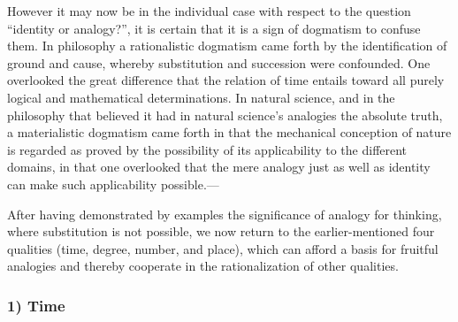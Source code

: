 \documentclass[12pt,a4paper]{book}
\newcommand{\opage}[1]{\marginnote{\footnotesize\textit{[#1]}}}
\begin{document}
\opage{186}However it may now be in the individual case with respect to the question
``identity or analogy?'', it is certain that it is a sign of dogmatism to
confuse them. In philosophy a rationalistic dogmatism came forth by the
identification of ground and cause, whereby substitution and succession were
confounded. One overlooked the great difference that the relation of time
entails toward all purely logical and mathematical determinations. In natural
science, and in the philosophy that believed it had in natural science's
analogies the absolute truth, a materialistic dogmatism came forth in that
the mechanical conception of nature is regarded as proved by the possibility
of its applicability to the different domains, in that one overlooked that
the mere analogy just as well as identity can make such applicability
possible.---

After having demonstrated by examples the significance of analogy for
thinking, where substitution is not possible, we now return to the
earlier-mentioned four qualities (time, degree, number, and place), which can
afford a basis for fruitful analogies and thereby cooperate in the
rationalization of other qualities.

\subsubsection*{1) Time}
\end{document}
